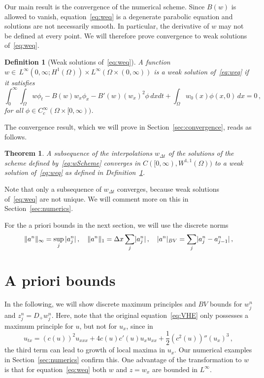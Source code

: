\documentclass[11pt,leqno]{amsart}
\newtheorem{definition}{Definition}[section]
\newtheorem{theorem}{Theorem}[section]
\newcommand{\pt}[1]{#1_t}
\newcommand{\px}[1]{#1_x }
\newcommand{\pxx}[1]{#1_{xx}}
\newcommand{\pxxx}[1]{#1_{xxx}}
\newcommand{\ptx}[1]{#1_{tx}}
\newcommand{\Dp}{D_+}
\newcommand{\normInf}[1]{\norm{#1}_\infty}
\newcommand{\normOne}[1]{\norm{#1}_1}
\newcommand{\normBV}[1]{\abs{#1}_{BV}}
\DeclarePairedDelimiter\abs{\lvert}{\rvert}
\DeclarePairedDelimiter\norm{\lVert}{\rVert}
\begin{document}
Our main result is the convergence of the numerical scheme. 
Since $B(w)$ is allowed to vanish, equation~\eqref{eq:weq} is a
degenerate parabolic equation and solutions are not necessarily
smooth. In particular, the derivative of $w$ may not be defined at every point. We will therefore prove convergence to weak solutions of~\eqref{eq:weq}.
\begin{definition}[Weak solutions of~\eqref{eq:weq}]\label{def:weakSolution}
A function $w\in\, L^\infty(0,\infty;H^1(\Omega))\times L^\infty(\Omega\times(0,\infty))$ is a weak solution of~\eqref{eq:weq} if it satisfies
\begin{equation}\label{eq:weakform}
  \int_0^\infty\int_\Omega w \pt{\phi} - B(w) \px{w}\px{\phi} - B'(w) (\px{w})^2 \phi \, dx dt + \int_\Omega w_0(x)\phi(x,0)\,dx=0\,, 
\end{equation}  
for all $\phi \in C^\infty_c(\Omega\times [0,\infty))$.
\end{definition}
The convergence result, which we will prove in Section~\ref{sec:convergence}, reads as follows.
\begin{theorem}\label{thm:convergence}
A subsequence of the interpolations $w_{\Delta t}$ of the solutions of the scheme defined by~\eqref{eq:wScheme} converges in $C([0,\infty),W^{1,1}(\Omega))$ to a weak solution of~\eqref{eq:weq} as defined in Definition~\ref{def:weakSolution}.  
\end{theorem}
Note that only a subsequence of $w_{\Delta t}$ converges, because weak solutions of~\eqref{eq:weq} are not unique. We will comment more on this in Section~\ref{sec:numerics}.

For the a priori bounds in the next section, we will use the discrete norms
\begin{align*}
  \normInf{a^n}=\sup_j\, \abs{a^n_j}\,,\quad \normOne{a^n}=\Delta x \sum_j \abs{a^n_j}\,,\quad \normBV{a^n}=\sum_j \abs{a^n_j-a^n_{j-1}}\,,
\end{align*}
\section{A priori bounds}\label{sec:bounds}
In the following, we will show discrete maximum principles and $BV$ bounds for $w^n_j$ and $z^n_j=\Dp w^n_j$. Here, note that
the original equation~\eqref{eq:VHE} only possesses a maximum principle for $u$, but not for $\px{u}$, since in
\begin{equation*}
  \ptx{u} =(c(u))^2 \pxxx{u}+ 4 c(u) c'(u) \px{u} \pxx{u} + \frac{1}{2} (c^2(u))'' (\px{u})^3\,,
\end{equation*}
the third term can lead to growth of local maxima in $\px{u}$. Our numerical examples in Section~\ref{sec:numerics} confirm this.
One advantage of the transformation to $w$ is that for equation~\eqref{eq:weq} both $w$ and $z=\px{w}$ are bounded in $L^\infty$.
\end{document}
